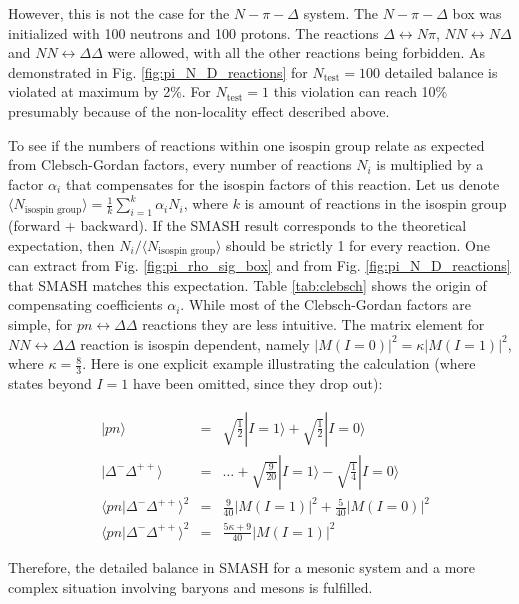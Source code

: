 However, this is not the case for the $N-\pi-\Delta$ system. The $N-\pi-\Delta$ box was
initialized with 100 neutrons and 100 protons. The reactions $\Delta
\leftrightarrow N\pi$, $NN \leftrightarrow N\Delta$ and $NN
\leftrightarrow \Delta \Delta$ were allowed, with all the other reactions
being forbidden. As demonstrated in Fig. \ref{fig:pi_N_D_reactions} for
$N_\text{test} = 100$ detailed balance is violated at maximum by 2\%. For
$N_\text{test} = 1$ this violation can reach 10\% presumably because of the
non-locality effect described above.

To see if the numbers of reactions within one isospin group relate as expected
from Clebsch-Gordan factors, every number of reactions $N_i$ is multiplied by a
factor $\alpha_i$ that compensates for the isospin factors of this reaction.
Let us denote $\langle N_\text{isospin group} \rangle = \frac{1}{k}
\sum_{i=1}^k \alpha_i N_i$, where $k$ is amount of reactions in the isospin
group (forward + backward). If the SMASH result corresponds to the theoretical
expectation, then $N_i/\langle N_\text{isospin group} \rangle$ should be
strictly 1 for every reaction. One can extract from Fig. \ref{fig:pi_rho_sig_box}
and from Fig. \ref{fig:pi_N_D_reactions} that SMASH matches this expectation.
Table \ref{tab:clebsch} shows the origin of compensating coefficients $\alpha_i$.
While most of the Clebsch-Gordan factors are simple, for $pn \leftrightarrow
\Delta\Delta$ reactions they are less intuitive. The matrix element for $NN
\leftrightarrow \Delta\Delta$ reaction is isospin dependent, namely $|M(I=0)|^2
= \kappa |M(I=1)|^2$, where $\kappa = \frac{8}{3}$. Here is one explicit
example illustrating the calculation (where states beyond $I=1$ have been
omitted, since they drop out):

\begin{align}
  &|pn\rangle &=& \sqrt{\frac{1}{2}} | I=1 \rangle + \sqrt{\frac{1}{2}} | I=0 \rangle \\
  &|\Delta^- \Delta^{++} \rangle &=& \dots + \sqrt{\frac{9}{20}} | I=1 \rangle -
                                   \sqrt{\frac{1}{4}} | I=0 \rangle \\
  &\langle pn | \Delta^- \Delta^{++} \rangle ^2 &=& \frac{9}{40} |M(I=1)|^2 +
                                   \frac{5}{40} |M(I=0)|^2  \\
  &\langle pn | \Delta^- \Delta^{++} \rangle ^2 &=& \frac{5\kappa +9}{40} |M(I=1)|^2
\end{align}

Therefore, the detailed balance in SMASH for a mesonic system and a more
complex situation involving baryons and mesons is fulfilled.

